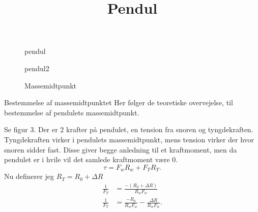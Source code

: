 
\title{\vspace{-1cm}Pendul\vspace{-1cm}}
\author{}
\date{}


\maketitle
\thispagestyle{fancy}
\begin{figure}[ht]
    \centering
    \caption{pendul}
    \label{fig:pendul}
\end{figure}
\begin{figure}[ht]
    \centering
    \caption{pendul2}
    \label{fig:pendul2}
\end{figure}
\begin{figure}[ht]
    \centering
    \caption{Massemidtpunkt}
    \label{fig:massemidtpunkt}
\end{figure}
\newpage
\begin{subexercise}{Bestemmelse af massemidtpunktet}
Her følger de teoretiske overvejelse, til bestemmelse af pendulets massemidtpunkt.
\end{subexercise}\newline
Se figur 3. Der er 2 krafter på pendulet, en tension fra snoren og tyngdekraften. Tyngdekraften virker i pendulets massemidtpunkt, mens tension virker der hvor snoren sidder fast. Disse giver begge anledning til et kraftmoment, men da pendulet er i hvile vil det samlede kraftmoment være 0.
\[
\tau = F_wR_w + F_TR_T
.\] 
Nu definerer jeg $R_T = R_0 + \Delta R$
\begin{align*}
	\frac{1}{F_T}&= \frac{-\left( R_0+\Delta R \right) }{R_wF_w} \\
	\frac{1}{F_T}&= \frac{-R_0}{R_wF_w}-\frac{\Delta R}{R_wF_w}
.\end{align*} 

